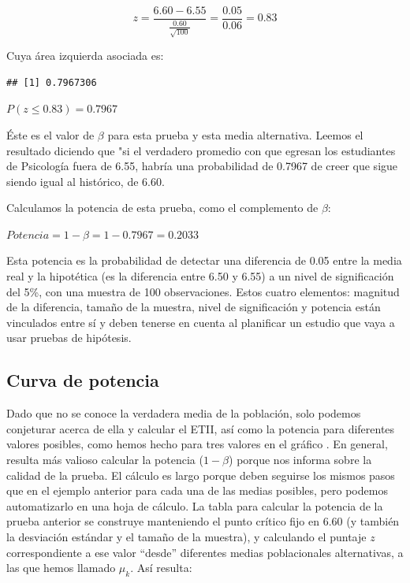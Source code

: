 \documentclass[]{book}
\begin{document}
\[z = \frac{6.60 - 6.55}{\frac{0.60}{\sqrt{100}}} = \frac{0.05}{0.06} = 0.83\]

Cuya área izquierda asociada es:

\begin{verbatim}
## [1] 0.7967306
\end{verbatim}

\(P(z \leq 0.83)=0.7967\)

Éste es el valor de \(\beta\) para esta prueba y esta media alternativa. Leemos
el resultado diciendo que "si el verdadero promedio con que egresan los
estudiantes de Psicología fuera de 6.55, habría una probabilidad de
0.7967 de creer que sigue siendo igual al histórico, de 6.60.

Calculamos la potencia de esta prueba, como el complemento de \(\beta\):

\(Potencia = 1-\beta = 1-0.7967 = 0.2033\)

Esta potencia es la probabilidad de detectar una diferencia de 0.05
entre la media real y la hipotética (es la diferencia entre 6.50 y 6.55) a un nivel de significación del 5\%, con una muestra de 100
observaciones. Estos cuatro elementos: magnitud de la diferencia, tamaño de la muestra, nivel de significación y potencia están vinculados entre sí y deben tenerse en cuenta al planificar un estudio que vaya a usar pruebas de hipótesis.

\hypertarget{curva-de-potencia}{%
\subsection{Curva de potencia}\label{curva-de-potencia}}

Dado que no se conoce la verdadera media de la población, solo podemos
conjeturar acerca de ella y calcular el ETII, así como la potencia para
diferentes valores posibles, como hemos hecho para tres valores en el
gráfico . En general, resulta más valioso calcular la potencia (\(1-\beta\)) porque nos informa sobre la calidad de la prueba. El cálculo es largo
porque deben seguirse los mismos pasos que en el ejemplo anterior para
cada una de las medias posibles, pero podemos automatizarlo en una hoja
de cálculo. La tabla para calcular la potencia de la prueba anterior se
construye manteniendo el punto crítico fijo en 6.60 (y también la
desviación estándar y el tamaño de la muestra), y calculando el puntaje
\(z\) correspondiente a ese valor ``desde'' diferentes medias poblacionales
alternativas, a las que hemos llamado \(\mu_{k}\). Así resulta:
\end{document}
